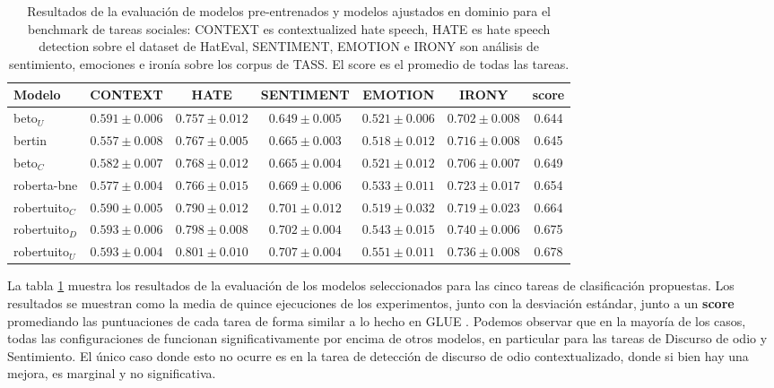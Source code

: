 \begin{table}
    \centering
    \footnotesize
    \begin{tabular}{l ccccc c}
        Modelo             & CONTEXT             &  HATE             &  SENTIMENT        &  EMOTION          &  IRONY            &     score \\
        \hline
        beto$_U$       & $0.591 \pm 0.006$ &  $0.757 \pm 0.012$ & $0.649 \pm 0.005$ & $0.521 \pm 0.006$ & $0.702 \pm 0.008$ &  0.644 \\
        bertin             & $0.557 \pm 0.008$ &  $0.767 \pm 0.005$ & $0.665 \pm 0.003$ & $0.518 \pm 0.012$ & $0.716 \pm 0.008$ &  0.645 \\
        beto$_C$         & $0.582 \pm 0.007$ &  $0.768 \pm 0.012$ & $0.665 \pm 0.004$ & $0.521 \pm 0.012$ & $0.706 \pm 0.007$ &  0.649 \\
        roberta-bne        & $0.577 \pm 0.004$ &  $0.766 \pm 0.015$ & $0.669 \pm 0.006$ & $0.533 \pm 0.011$ & $0.723 \pm 0.017$ &  0.654 \\
        \hline
        robertuito$_C$   & $0.590 \pm 0.005$ &  $0.790 \pm 0.012$ & $0.701 \pm 0.012$ & $0.519 \pm 0.032$ & $0.719 \pm 0.023$ &  0.664 \\
        robertuito$_D$   & $0.593 \pm 0.006$ &  $0.798 \pm 0.008$ & $0.702 \pm 0.004$ & $0.543 \pm 0.015$ & $0.740 \pm 0.006$ &  0.675 \\
        robertuito$_U$ & $0.593 \pm 0.004$ &  $0.801 \pm 0.010$ & $0.707 \pm 0.004$ & $0.551 \pm 0.011$ & $0.736 \pm 0.008$ &  0.678 \\
        \hline
    \end{tabular}
    \caption{Resultados de la evaluación de modelos pre-entrenados y modelos ajustados en dominio para el benchmark de tareas sociales: CONTEXT es contextualized hate speech, HATE es hate speech detection sobre el dataset de HatEval, SENTIMENT, EMOTION e IRONY son análisis de sentimiento, emociones e ironía sobre los corpus de TASS. El score es el promedio de todas las tareas.}
    \label{tab:robertuito_evaluation_results}
\end{table}


La tabla \ref{tab:robertuito_evaluation_results} muestra los resultados de la evaluación de los modelos seleccionados para las cinco tareas de clasificación propuestas. Los resultados se muestran como la media de quince ejecuciones de los experimentos, junto con la desviación estándar, junto a un \textbf{score} promediando las puntuaciones de cada tarea de forma similar a lo hecho en GLUE \cite{wang-etal-2018-glue}. Podemos observar que en la mayoría de los casos, todas las configuraciones de \robertuito{} funcionan significativamente por encima de otros modelos, en particular para las tareas de Discurso de odio y Sentimiento. El único caso donde esto no ocurre es en la tarea de detección de discurso de odio contextualizado, donde si bien hay una mejora, es marginal y no significativa.

